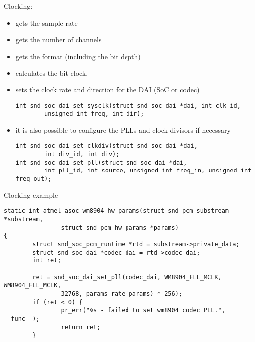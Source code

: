 \begin{frame}[fragile]{Clocking: }
  \begin{itemize}
  \item {} gets the sample rate
  \item {} gets the number of channels
  \item {} gets the format (including the bit depth)
  \item {} calculates the bit clock.
  \item {} sets the clock rate and
    direction for the DAI (SoC or codec)
    \begin{block}{}
      \begin{verbatim}
int snd_soc_dai_set_sysclk(struct snd_soc_dai *dai, int clk_id,
        unsigned int freq, int dir);
      \end{verbatim}
    \end{block}
  \item it is also possible to configure the PLLs and clock divisors
    if necessary
    \begin{block}{}
      \fontsize{9}{9}\selectfont
      \begin{verbatim}
int snd_soc_dai_set_clkdiv(struct snd_soc_dai *dai,
        int div_id, int div);
int snd_soc_dai_set_pll(struct snd_soc_dai *dai,
        int pll_id, int source, unsigned int freq_in, unsigned int freq_out);
      \end{verbatim}
    \end{block}
  \end{itemize}
\end{frame}

\begin{frame}[fragile]{Clocking example}
  \begin{block}{}
    \fontsize{9}{9}\selectfont
    \begin{verbatim}
static int atmel_asoc_wm8904_hw_params(struct snd_pcm_substream *substream,
                struct snd_pcm_hw_params *params)
{
        struct snd_soc_pcm_runtime *rtd = substream->private_data;
        struct snd_soc_dai *codec_dai = rtd->codec_dai;
        int ret;

        ret = snd_soc_dai_set_pll(codec_dai, WM8904_FLL_MCLK, WM8904_FLL_MCLK,
                32768, params_rate(params) * 256);
        if (ret < 0) {
                pr_err("%s - failed to set wm8904 codec PLL.", __func__);
                return ret;
        }
    \end{verbatim}
  \end{block}
\end{frame}

